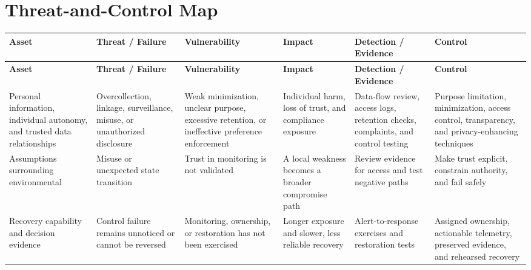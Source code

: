 \documentclass[11pt]{article}
\begin{document}
\section*{Threat-and-Control Map}
\begingroup\scriptsize\setlength{\tabcolsep}{2pt}
\begin{longtable}{>{\RaggedRight\arraybackslash}p{}>{\RaggedRight\arraybackslash}p{}>{\RaggedRight\arraybackslash}p{}>{\RaggedRight\arraybackslash}p{}>{\RaggedRight\arraybackslash}p{}>{\RaggedRight\arraybackslash}p{}}
\toprule\rowcolor{Navy}\color{white}\textbf{Asset} & \color{white}\textbf{Threat / Failure} & \color{white}\textbf{Vulnerability} & \color{white}\textbf{Impact} & \color{white}\textbf{Detection / Evidence} & \color{white}\textbf{Control}\\\midrule
\endfirsthead
\toprule\rowcolor{Navy}\color{white}\textbf{Asset} & \color{white}\textbf{Threat / Failure} & \color{white}\textbf{Vulnerability} & \color{white}\textbf{Impact} & \color{white}\textbf{Detection / Evidence} & \color{white}\textbf{Control}\\\midrule
\endhead
Personal information, individual autonomy, and trusted data relationships & Overcollection, linkage, surveillance, misuse, or unauthorized disclosure & Weak minimization, unclear purpose, excessive retention, or ineffective preference enforcement & Individual harm, loss of trust, and compliance exposure & Data-flow review, access logs, retention checks, complaints, and control testing & Purpose limitation, minimization, access control, transparency, and privacy-enhancing techniques\\\midrule
Assumptions surrounding environmental & Misuse or unexpected state transition & Trust in monitoring is not validated & A local weakness becomes a broader compromise path & Review evidence for access and test negative paths & Make trust explicit, constrain authority, and fail safely\\\midrule
Recovery capability and decision evidence & Control failure remains unnoticed or cannot be reversed & Monitoring, ownership, or restoration has not been exercised & Longer exposure and slower, less reliable recovery & Alert-to-response exercises and restoration tests & Assigned ownership, actionable telemetry, preserved evidence, and rehearsed recovery\\\midrule
\bottomrule
\end{longtable}
\endgroup
\end{document}

